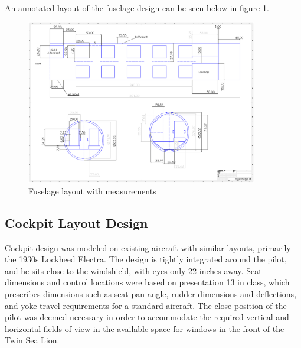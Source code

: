 \documentclass[conf]{new-aiaa}
\begin{document}
An annotated layout of the fuselage design can be seen below in figure \ref{fig:fuselage_annotated}.

\begin{figure}[H]
    \centering
    \includegraphics[angle=90, width=0.9\textwidth]{plots/fuselage_annotated}
    \caption{Fuselage layout with measurements}
    \label{fig:fuselage_annotated}
\end{figure}


\subsection{Cockpit Layout Design}

Cockpit design was modeled on existing aircraft with similar layouts, primarily the 1930s Lockheed Electra. The design is tightly integrated around the pilot, and he sits close to the windshield, with eyes only 22 inches away. Seat dimensions and control locations were based on presentation 13 \cite{pres13} in class, which prescribes dimensions such as seat pan angle, rudder dimensions and deflections, and yoke travel requirements for a standard aircraft. The close position of the pilot was deemed necessary in order to accommodate the required vertical and horizontal fields of view in the available space for windows in the front of the Twin Sea Lion. 
\end{document}
